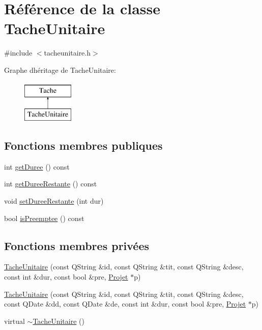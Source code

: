 \hypertarget{class_tache_unitaire}{}\section{Référence de la classe Tache\+Unitaire}
\label{class_tache_unitaire}


{\ttfamily \#include $<$tacheunitaire.\+h$>$}

Graphe d\textquotesingle{}héritage de Tache\+Unitaire\+:\begin{figure}[H]
\begin{center}
\leavevmode
\includegraphics[height=2.000000cm]{class_tache_unitaire}
\end{center}
\end{figure}
\subsection*{Fonctions membres publiques}
\begin{DoxyCompactItemize}
\item 
int \hyperlink{class_tache_unitaire_a2f1c93887c652e5581df4357bc72949b}{get\+Duree} () const 
\item 
int \hyperlink{class_tache_unitaire_aa9b7e58e61dfded16d5a2508d33734c5}{get\+Duree\+Restante} () const 
\item 
void \hyperlink{class_tache_unitaire_a5b1dc4cb5b374fce9c26abb4c954cef8}{set\+Duree\+Restante} (int dur)
\item 
bool \hyperlink{class_tache_unitaire_a4a25bc2f0b3e6ebd6c0617d22328c986}{is\+Preemptee} () const 
\end{DoxyCompactItemize}
\subsection*{Fonctions membres privées}
\begin{DoxyCompactItemize}
\item 
\hyperlink{class_tache_unitaire_acca628b1c239bf191fbbf869ad15cdd2}{Tache\+Unitaire} (const Q\+String \&id, const Q\+String \&tit, const Q\+String \&desc, const int \&dur, const bool \&pre, \hyperlink{class_projet}{Projet} $\ast$p)
\item 
\hyperlink{class_tache_unitaire_ab97fdcb6d8d43ff76d46a7ae650eba3d}{Tache\+Unitaire} (const Q\+String \&id, const Q\+String \&tit, const Q\+String \&desc, const Q\+Date \&dd, const Q\+Date \&de, const int \&dur, const bool \&pre, \hyperlink{class_projet}{Projet} $\ast$p)
\item 
virtual \hyperlink{class_tache_unitaire_a54c9937fb3088c48348883ad1b385f8c}{$\sim$\+Tache\+Unitaire} ()
\end{DoxyCompactItemize}
